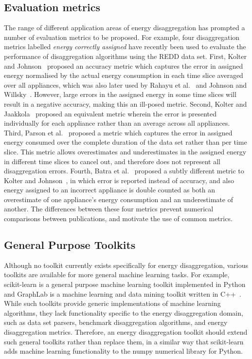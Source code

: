 \documentclass{sig-alternate}
\begin{document}
\subsection{Evaluation metrics}
\label{sec:evaluation_metrics}
\noindent The range of different application areas of energy disaggregation has prompted a number of evaluation metrics to be proposed. For example, four disaggregation metrics labelled \emph{energy correctly assigned} have recently been used to evaluate the performance of disaggregation algorithms using the REDD data set. First, Kolter and Johnson~\cite{redd} proposed an accuracy metric which captures the error in assigned energy normalised by the actual energy consumption in each time slice averaged over all appliances, which was also later used by Rahayu et al.~\cite{rahayu_2012} and Johnson and Willsky~\cite{johnson_2013}. However, large errors in the assigned energy in some time slices will result in a negative accuracy, making this an ill-posed metric. Second, Kolter and Jaakkola~\cite{kolter_2012} proposed an equivalent metric wherein the error is presented individually for each appliance rather than an average across all appliances. Third, Parson et al.~\cite{parson_2012} proposed a metric which captures the error in assigned energy consumed over the complete duration of the data set rather than per time slice. This metric allows overestimates and underestimates in the assigned energy in different time slices to cancel out, and therefore does not represent all disaggregation errors. Fourth, Batra et al.~\cite{batra_2013} proposed a subtly different metric to Kolter and Johnson~\cite{redd}, in which error is reported instead of accuracy, and also energy assigned to an incorrect appliance is double counted as both an overestimate of one appliance's energy consumption and an underestimate of another. The differences between these four metrics prevent numerical comparisons between publications, and motivate the use of common metrics.

\subsection{General Purpose Toolkits}
\label{sec:need_nilm_toolkit}
\noindent Although no toolkit currently exists specifically for energy disaggregation, various toolkits are available for more general machine learning tasks. For example, scikit-learn is a general purpose machine learning toolkit implemented in Python~\cite{scikit} and GraphLab is a machine learning and data mining toolkit written in C++~\cite{graphlab}. While such toolkits provide generic implementations of machine learning algorithms, they lack functionality specific to the energy disaggregation domain, such as data set parsers, benchmark disaggregation algorithms, and energy disaggregation metrics. Therefore, an energy disaggregation toolkit should extend such general toolkits rather than replace them, in a similar way that scikit-learn adds machine learning functionality to the numpy numerical library for Python. 
\end{document}
